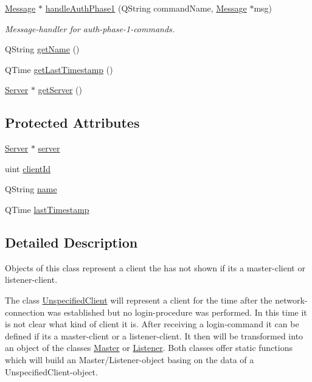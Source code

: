 \begin{DoxyCompactItemize}
\hyperlink{class_message}{Message} $\ast$ \hyperlink{class_server_appl_1_1_unspecified_client_a2181c87edd7342462b30badffa1a0dc1}{handle\+Auth\+Phase1} (Q\+String command\+Name, \hyperlink{class_message}{Message} $\ast$msg)
\begin{DoxyCompactList}\small\item\em Message-\/handler for auth-\/phase-\/1-\/commands. \end{DoxyCompactList}\item 
Q\+String \hyperlink{class_server_appl_1_1_unspecified_client_a6e1c8e92bc45576046956942e515da4a}{get\+Name} ()
\item 
Q\+Time \hyperlink{class_server_appl_1_1_unspecified_client_a539c101624ce66e1bc2faae200eb43c0}{get\+Last\+Timestamp} ()
\item 
\hyperlink{class_server_appl_1_1_server}{Server} $\ast$ \hyperlink{class_server_appl_1_1_unspecified_client_a8aed9d0af091d198b6805b292d63e481}{get\+Server} ()
\end{DoxyCompactItemize}
\subsection*{Protected Attributes}
\begin{DoxyCompactItemize}
\item 
\hyperlink{class_server_appl_1_1_server}{Server} $\ast$ \hyperlink{class_server_appl_1_1_unspecified_client_aed25c6192d4e27602c2bf4f0721360b5}{server}
\item 
uint \hyperlink{class_server_appl_1_1_unspecified_client_a9a3cf2d070f19fb2bfd7d544053955b0}{client\+Id}
\item 
Q\+String \hyperlink{class_server_appl_1_1_unspecified_client_a66f3dc8bd71e34f52ad02f692808593c}{name}
\item 
Q\+Time \hyperlink{class_server_appl_1_1_unspecified_client_a243b627d332e06cd922148b7008af97e}{last\+Timestamp}
\end{DoxyCompactItemize}


\subsection{Detailed Description}
Objects of this class represent a client the has not shown if its a master-\/client or listener-\/client. 

The class \hyperlink{class_server_appl_1_1_unspecified_client}{Unspecified\+Client} will represent a client for the time after the network-\/connection was established but no login-\/procedure was performed. In this time it is not clear what kind of client it is. After receiving a login-\/command it can be defined if its a master-\/client or a listener-\/client. It then will be transformed into an object of the classes \hyperlink{class_server_appl_1_1_master}{Master} or \hyperlink{class_server_appl_1_1_listener}{Listener}. Both classes offer static functions which will build an Master/\+Listener-\/object basing on the data of a Unspecified\+Client-\/object.

